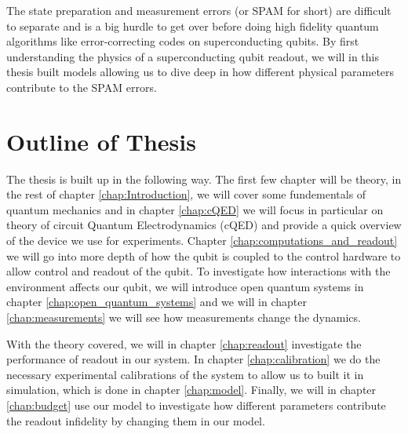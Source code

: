 The state preparation and measurement errors (or SPAM for short) are difficult to separate and is a big hurdle to get over before doing high fidelity quantum algorithms like error-correcting codes on superconducting qubits. By first understanding the physics of a superconducting qubit readout, we will in this thesis built models allowing us to dive deep in how different physical parameters contribute to the SPAM errors.




\newpage
\section{Outline of Thesis}
The thesis is built up in the following way. The first few chapter will be theory, in the rest of chapter \ref{chap:Introduction}, we will cover some fundementals of quantum mechanics and in chapter \ref{chap:cQED} we will focus in particular on theory of circuit Quantum Electrodynamics (cQED) and provide a quick overview of the device we use for experiments. Chapter \ref{chap:computations_and_readout} we will go into more depth of how the qubit is coupled to the control hardware to allow control and readout of the qubit. To investigate how interactions with the environment affects our qubit, we will introduce open quantum systems in chapter \ref{chap:open_quantum_systems} and we will in chapter \ref{chap:measurements} we will see how measurements change the dynamics.

With the theory covered, we will in chapter \ref{chap:readout} investigate the performance of readout in our system. In chapter \ref{chap:calibration} we do the necessary experimental calibrations of the system to allow us to built it in simulation, which is done in chapter \ref{chap:model}. Finally, we will in chapter \ref{chap:budget} use our model to investigate how different parameters contribute the readout infidelity by changing them in our model.  



